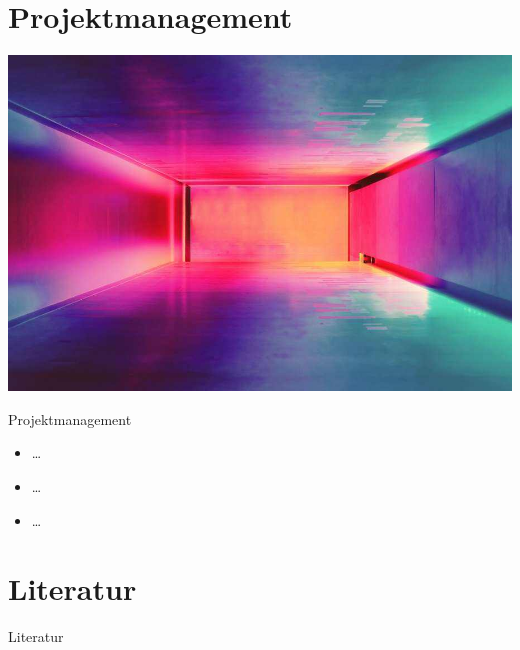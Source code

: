 \documentclass[presentation,bigger,aspectratio=169]{beamer}
\begin{document}
\section{Projektmanagement}
\label{sec:org2231068}
\begin{frame}[label={sec:orgca358e1}]{\MakeUppercase{\insertsection}}
\begin{center}
\begin{center}
\includegraphics[height=0.77\textheight]{./img/m1_praes_empty_02.jpg}
\label{fig:m1_praes_empty_02}
\end{center}
\end{center}
\end{frame}
\begin{frame}[label={sec:org36f2842}]{Projektmanagement}
\begin{itemize}
\item \ldots{}
\item \ldots{}
\item \ldots{}
\end{itemize}
\end{frame}
\section*{Literatur}
\label{sec:orgb72d647}
\begin{frame}[allowframebreaks]{Literatur}
\printbibliography[heading=none]
\end{frame}
\appendix
\end{document}
